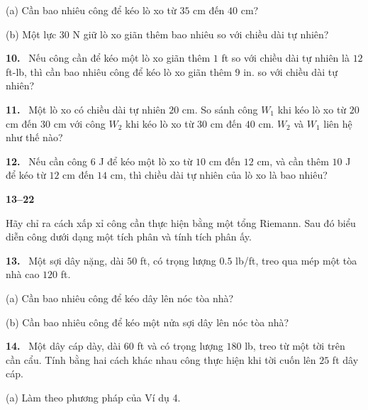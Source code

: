 \documentclass[12pt,a4paper]{article}
\newcommand{\bt}[1]{\par\smallskip\Needspace{5\baselineskip}\noindent\textbf{#1.}\ }
\newcommand{\group}[1]{\par\Needspace{11\baselineskip}\medskip\noindent\textbf{#1}\par\nopagebreak[4]}
\begin{document}
(a) Cần bao nhiêu công để kéo lò xo từ $35$ cm đến $40$ cm?

(b) Một lực $30$ N giữ lò xo giãn thêm bao nhiêu so với chiều dài tự nhiên?
\bt{10} Nếu công cần để kéo một lò xo giãn thêm $1$ ft so với chiều dài tự nhiên là $12$ ft-lb, thì cần bao nhiêu công để kéo lò xo giãn thêm $9$ in. so với chiều dài tự nhiên?
\bt{11} Một lò xo có chiều dài tự nhiên $20$ cm. So sánh công $W_1$ khi kéo lò xo từ $20$ cm đến $30$ cm với công $W_2$ khi kéo lò xo từ $30$ cm đến $40$ cm. $W_2$ và $W_1$ liên hệ như thế nào?
\bt{12} Nếu cần công $6$ J để kéo một lò xo từ $10$ cm đến $12$ cm, và cần thêm $10$ J để kéo từ $12$ cm đến $14$ cm, thì chiều dài tự nhiên của lò xo là bao nhiêu?
\group{13–22}
Hãy chỉ ra cách xấp xỉ công cần thực hiện bằng một tổng Riemann. Sau đó biểu diễn công dưới dạng một tích phân và tính tích phân ấy.
\bt{13} Một sợi dây nặng, dài $50$ ft, có trọng lượng $0.5$ lb/ft, treo qua mép một tòa nhà cao $120$ ft.

(a) Cần bao nhiêu công để kéo dây lên nóc tòa nhà?

(b) Cần bao nhiêu công để kéo một nửa sợi dây lên nóc tòa nhà?
\bt{14} Một dây cáp dày, dài $60$ ft và có trọng lượng $180$ lb, treo từ một tời trên cần cẩu. Tính bằng hai cách khác nhau công thực hiện khi tời cuốn lên $25$ ft dây cáp.

(a) Làm theo phương pháp của Ví dụ 4.
\end{document}
